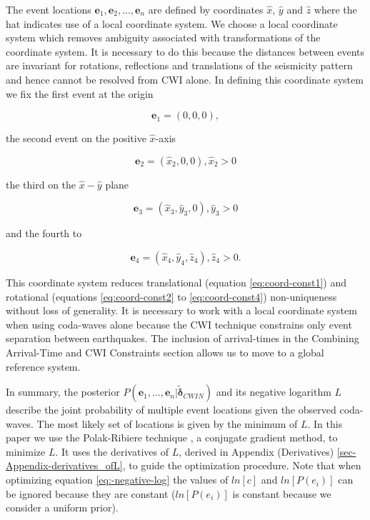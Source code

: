 \documentclass[12pt,double]{article}
\begin{document}
The event locations $\mathbf{e}_1, \mathbf{e}_2, ..., \mathbf{e}_n$
are defined by coordinates $\hat{x}$, $\hat{y}$ and $\hat{z}$ where
the hat indicates use of a local coordinate system. We choose a
local coordinate system which removes ambiguity associated with
transformations of the coordinate system. It is necessary to do this
because the distances between events are invariant for rotations,
reflections and translations of the seismicity pattern and hence
cannot be resolved from CWI alone. In defining this coordinate
system we fix the first event at the origin
\begin{linenomath*} \begin{equation} 
\label{eq:coord-const1}
\mathbf{e}_1 = (0,0,0),
\end{equation} \end{linenomath*}
the second event on the positive $\hat{x}$-axis
\begin{linenomath*} \begin{equation} 
\label{eq:coord-const2}
\mathbf{e}_2 = (\hat{x}_2, 0, 0), \hat{x}_2>0
\end{equation} \end{linenomath*}
the third on the $\hat{x}-\hat{y}$ plane
\begin{linenomath*} \begin{equation}
\label{eq:coord-const3}
\mathbf{e}_3 = (\hat{x}_3,\hat{y}_3,0), \hat{y}_3>0
\end{equation} \end{linenomath*}
and the fourth to
\begin{linenomath*} \begin{equation} 
\label{eq:coord-const4}
\mathbf{e}_4 = (\hat{x}_4,\hat{y}_4,\hat{z}_4), \hat{z}_4>0.
\end{equation} \end{linenomath*}
This coordinate system reduces translational (equation \ref{eq:coord-const1})
and rotational (equations \ref{eq:coord-const2} to \ref{eq:coord-const4}) non-uniqueness
without loss of generality. It is necessary to work with a local coordinate
system when using coda-waves alone because the CWI technique constrains only event separation
between earthquakes. The inclusion of arrival-times in the Combining Arrival-Time 
and CWI Constraints section 
allows us to move to a global reference system.

In summary, the posterior $P(\mathbf{e}_1,...,\mathbf{e}_n |
\widetilde{\mathbf{\delta}}_{CWIN})$ and its negative logarithm $L$
describe the joint probability of multiple event locations given the
observed coda-waves. The most likely set of locations is given by
the minimum of $L$.   In this paper we use the Polak-Ribiere
technique \citep{dr_Press87a}, a conjugate gradient method, to
minimize $L$. It uses the derivatives of $L$, derived in Appendix (Derivatives)
\ref{sec-Appendix-derivatives_ofL}, to guide the
optimization procedure. Note that when optimizing
equation \ref{eq:-negative-log} the values of $ln \left[ c \right]$
and $ln \left[ P(e_i) \right]$ can be ignored because they are
constant ($ln \left[ P(e_i) \right]$ is constant because we
consider a uniform prior).
\end{document}
